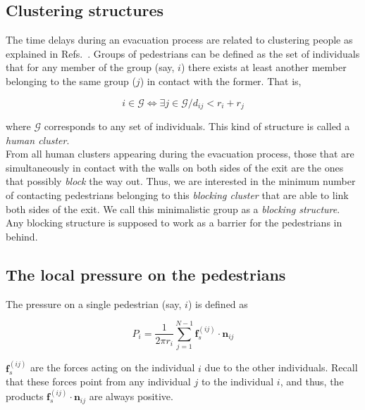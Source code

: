 \subsection{\label{human}Clustering structures}

The time delays during an evacuation process are related to clustering people 
as explained in Refs.~\cite{Dorso1,Dorso2}. Groups of pedestrians can 
be defined as the set of individuals that for any member of the group (say, 
$i$) there exists at least another member belonging to the same group ($j$) 
in contact with the former. That is, 

\begin{equation}
 i\in\mathcal{G} \Leftrightarrow \exists j\in\mathcal{G}/d_{ij}<r_i+r_j
\end{equation}

\noindent where $\mathcal{G}$ corresponds to any set of individuals. 
 This kind of structure is called a \textit{human cluster}. \\

From all human clusters appearing during the evacuation process, those that 
are simultaneously in contact with the walls on both sides of the exit are 
the ones that possibly \textit{block} the way out. Thus, we are interested 
in the minimum number of contacting pedestrians belonging to this 
\textit{blocking cluster} that are able to link both sides of the exit. We call 
this minimalistic group as a \textit{blocking structure}. Any blocking structure 
is supposed to work as a barrier for the pedestrians in behind.   \\



\subsection{\label{pressure}The local pressure on the pedestrians}

The pressure on a single pedestrian (say, $i$) is defined as \cite{Helbing1}

\begin{equation} 
P_i=\displaystyle\frac{1}{2\pi 
r_i}\displaystyle\sum_{j=1}^{N-1}\mathbf{f}_s^{(ij)}\cdot\mathbf{n}_{ij}
\label{eqn_4b}
\end{equation}

$\mathbf{f}_{s}^{(ij)}$ are the forces acting on the individual $i$ due to the 
other individuals. Recall that these forces point from any individual $j$ to 
the individual $i$, and thus, the products 
$\mathbf{f}_{s}^{(ij)}\cdot\mathbf{n}_{ij}$ are always positive. \\ 

